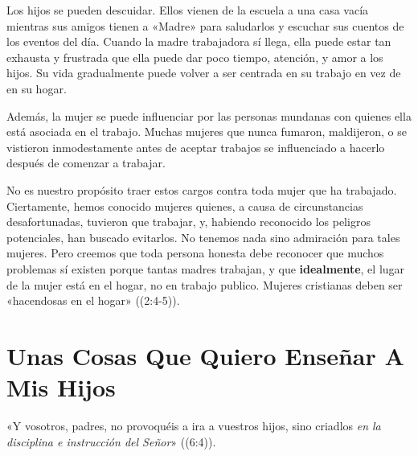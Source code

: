 \documentclass[12pt, twoside, openright]{book}
\begin{document}
Los hijos se pueden descuidar. Ellos vienen de la escuela a una casa vacía mientras sus amigos tienen a «Madre» para saludarlos y escuchar sus cuentos de los eventos del día. Cuando la madre trabajadora sí llega, ella puede estar tan exhausta y frustrada que ella puede dar poco tiempo, atención, y amor a los hijos. Su vida gradualmente puede volver a ser centrada en su trabajo en vez de en su hogar.

Además, la mujer se puede influenciar por las personas mundanas con quienes ella está asociada en el trabajo. Muchas mujeres que nunca fumaron, maldijeron, o se vistieron inmodestamente antes de aceptar trabajos se influenciado a hacerlo después de comenzar a trabajar.

No es nuestro propósito traer estos cargos contra toda mujer que ha trabajado. Ciertamente, hemos conocido mujeres quienes, a causa de circunstancias desafortunadas, tuvieron que trabajar, y, habiendo reconocido los peligros potenciales, han buscado evitarlos. No tenemos nada sino admiración para tales mujeres. Pero creemos que toda persona honesta debe reconocer que muchos problemas sí existen porque tantas madres trabajan, y que \textbf{idealmente}, el lugar de la mujer está en el hogar, no en trabajo publico. Mujeres cristianas deben ser «hacendosas en el hogar» ((2:4-5)).

\section{Unas Cosas Que Quiero Enseñar A Mis Hijos}
«Y vosotros, padres, no provoquéis a ira a vuestros hijos, sino criadlos \textit{en la disciplina e instrucción del Señor}» ((6:4)). 
\end{document}
